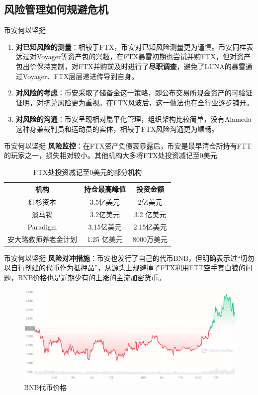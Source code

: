 \subsection{风险管理如何规避危机}
\begin{frame}{币安何以坚挺}
    \begin{enumerate}
    \item \textbf{对已知风险的测量}：相较于FTX，币安对已知风险测量更为谨慎。币安同样表达过对Voyager等资产包的兴趣，在FTX暴雷初期也尝试并购FTX，但对资产包出价保持克制，对FTX并购前及时进行了\textbf{尽职调查}，避免了LUNA的暴雷通过Voyager、FTX层层递进传导到自身。
    \item \textbf{对风险的考虑}：币安采取了储备金这一策略，即公布交易所现金资产的可验证证明，对挤兑风险更为重视。在FTX风波后，这一做法也在全行业逐步铺开。
    \item \textbf{对风险的沟通}：币安呈现相对扁平化管理，组织架构比较简单，没有Alameda这种身兼裁判员和运动员的实体，相较于FTX风险沟通更为顺畅。
    \end{enumerate}
\end{frame}
\begin{frame}{币安何以坚挺}
    \textbf{风险监控}：在FTX资产负债表暴露后，币安是最早清仓所持有FTT的玩家之一，损失相对较小。其他机构大多将FTX处投资减记至0美元
    \begin{table}[H]
        \centering
        \caption{FTX处投资减记至0美元的部分机构}
        \begin{tabular}{|c|c|c|}
            \hline
            机构&持仓最高峰值&投资金额\\\hline
            红杉资本&3.5亿美元&2亿美元\\
            淡马锡&3.2亿美元&3.2 亿美元\\
            Paradigm&3.15亿美元&2.15亿美元\\
            安大略教师养老金计划&1.25 亿美元&8000万美元\\\hline
        \end{tabular}
    \end{table}
\end{frame}
\begin{frame}{币安何以坚挺}
    \textbf{风险对冲措施}：币安也发行了自己的代币BNB，但明确表示过“切勿以自行创建的代币作为抵押品”，从源头上规避掉了FTX利用FTT空手套白狼的问题，BNB价格也是近期少有的上涨的主流加密货币。
    \begin{figure}[H]
        \includegraphics[width=\linewidth]{img/bnb.png}
        \caption{BNB代币价格}
    \end{figure}
\end{frame}

